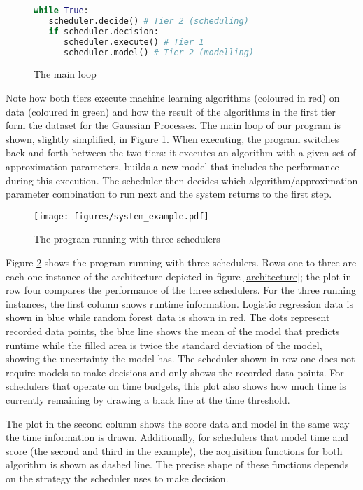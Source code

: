 \documentclass[a4paper,12pt,twoside,openright]{report}
\begin{document}
\begin{figure}[ht]
\begin{lstlisting}[language=Python]
while True:
   scheduler.decide() # Tier 2 (scheduling)
   if scheduler.decision:
      scheduler.execute() # Tier 1
      scheduler.model() # Tier 2 (modelling)
\end{lstlisting}
\caption{The main loop}
\label{mainloop}
\end{figure}


Note how both tiers execute machine learning algorithms (coloured in red) on data (coloured in green) and how the result of the algorithms in the first tier form the dataset for the Gaussian Processes. The main loop of our program is shown, slightly simplified, in Figure \ref{mainloop}. When executing, the program switches back and forth between the two tiers: it executes an algorithm with a given set of approximation parameters, builds a new model that includes the performance during this execution. The scheduler then decides which algorithm/approximation parameter combination to run next and the system returns to the first step.

\begin{figure}[p]
    \centerline{\texttt{[image: figures/system\_example.pdf]}}
  \caption{The program running with three schedulers}
    \label{systemexample}
\end{figure}

Figure \ref{systemexample} shows the program running with three schedulers. Rows one to three are each one instance of the architecture depicted in figure \ref{architecture}; the plot in row four compares the performance of the three schedulers. For the three running instances, the first column shows runtime information. Logistic regression data is shown in blue while random forest data is shown in red. The dots represent recorded data points, the blue line shows the mean of the model that predicts runtime while the filled area is twice the standard deviation of the model, showing the uncertainty the model has. The scheduler shown in row one does not require models to make decisions and only shows the recorded data points. For schedulers that operate on time budgets, this plot also shows how much time is currently remaining by drawing a black line at the time threshold.

The plot in the second column shows the score data and model in the same way the time information is drawn. Additionally, for schedulers that model time and score (the second and third in the example), the acquisition functions for both algorithm is shown as dashed line. The precise shape of these functions depends on the strategy the scheduler uses to make decision. 
\end{document}
